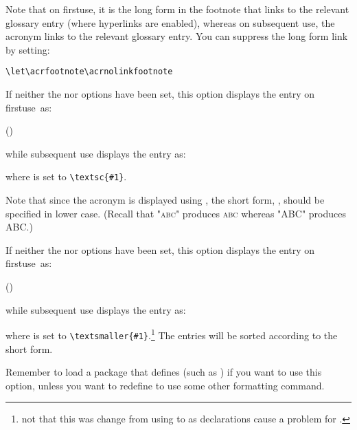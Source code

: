 \documentclass{nlctdoc}
\newcommand*{\firstuse}{\gls{firstuse}}
\begin{document}
\begin{description}
Note that on \firstuse, it is the long form in the footnote that
links to the relevant glossary entry (where hyperlinks are enabled),
whereas on subsequent use, the acronym links to the relevant
glossary entry. You can suppress the long form link by setting:
\begin{verbatim}
\let\acrfootnote\acrnolinkfootnote
\end{verbatim}

\item[\pkgopt{smallcaps}]\ifpdf\mbox{}\par\fi
If neither the  nor  options
have been set, this option displays the entry on \firstuse\ as:
\begin{display}
 ()
\end{display}
while subsequent use displays the entry as:
\begin{display}
\end{display}
where  is set to \verb|\textsc{#1}|.

\begin{important}
Note that since the acronym is displayed using , 
the short form, , should be specified in lower case.
\ifpdf(Recall that "\textsc{abc}" produces \textsc{abc} whereas 
"\textsc{ABC}" produces \textsc{ABC}.)\fi
\end{important}

\item[\pkgopt{smaller}]\ifpdf\mbox{}\par\fi
If neither the  nor  options
have been set, this option displays the entry on \firstuse\ as:
\begin{display}
 ()
\end{display}
while subsequent use displays the entry as:
\begin{display}
\end{display}
where  is set to 
\verb|\textsmaller{#1}|.\footnote{not that this was change from 
using  to  as declarations
cause a problem for .}
The entries will be sorted according to the short form.

\begin{important}
Remember to load a package that defines  (such as
) if you want to use this option, unless you want
to redefine  to use some other formatting command.
\end{important}


\end{description}
\end{document}
